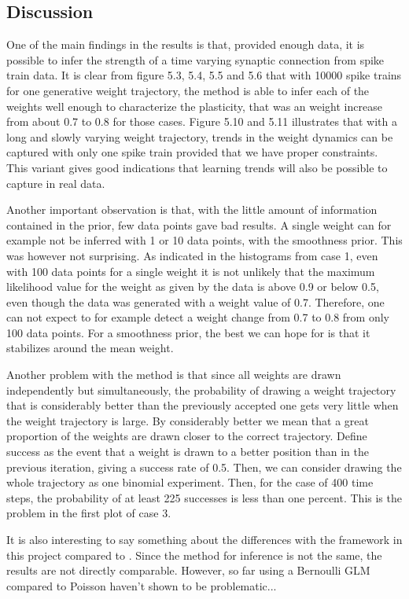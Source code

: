 \subsection{Discussion} 

One of the main findings in the results is that, provided enough data, it is possible to infer the strength of a time varying synaptic connection from spike train data. It is clear from figure 5.3, 5.4, 5.5 and 5.6 that with 10000 spike trains for one generative weight trajectory, the method is able to infer each of the weights well enough to characterize the plasticity, that was an weight increase from about 0.7 to 0.8 for those cases. Figure 5.10 and 5.11 illustrates that with a long and slowly varying weight trajectory, trends in the weight dynamics can be captured with only one spike train provided that we have proper constraints. This variant gives good indications that learning trends will also be possible to capture in real data. 

Another important observation is that, with the little amount of information contained in the prior, few data points gave bad results. A single weight can for example not be inferred with 1 or 10 data points, with the smoothness prior. This was however not surprising. As indicated in the histograms from case 1, even with 100 data points for a single weight it is not unlikely that the maximum likelihood value for the weight as given by the data is above 0.9 or below 0.5, even though the data was generated with a weight value of 0.7. Therefore, one can not expect to for example detect a weight change from 0.7 to 0.8 from only 100 data points. For a smoothness prior, the best we can hope for is that it stabilizes around the mean weight.

Another problem with the method is that since all weights are drawn independently but simultaneously, the probability of drawing a weight trajectory that is considerably better than the previously accepted one gets very little when the weight trajectory is large. By considerably better we mean that a great proportion of the weights are drawn closer to the correct trajectory. Define success as the event that a weight is drawn to a better position than in the previous iteration, giving a success rate of 0.5. Then, we can consider drawing the whole trajectory as one binomial experiment. Then, for the case of 400 time steps, the probability of at least 225 successes is less than one percent. This is the problem in the first plot of case 3.  

It is also interesting to say something about the differences with the framework in this project compared to \cite{Linderman}. Since the method for inference is not the same, the results are not directly comparable. However, so far using a Bernoulli GLM compared to Poisson haven't shown to be problematic...


